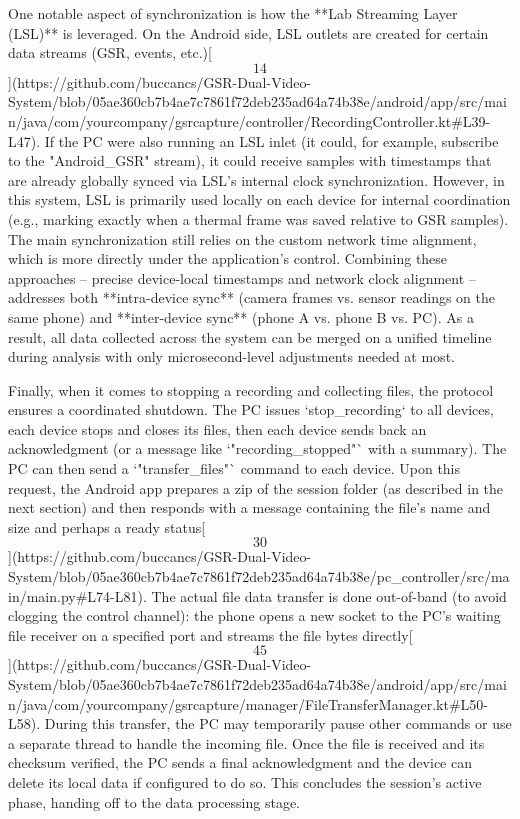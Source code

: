 \documentclass[12pt,a4paper]{article}
\begin{document}
{One notable aspect of synchronization is how the **Lab Streaming Layer
(LSL)** is leveraged. On the Android side, LSL outlets are created for
certain data streams (GSR, events,
etc.)[\[14\]](https://github.com/buccancs/GSR-Dual-Video-System/blob/05ae360cb7b4ae7c7861f72deb235ad64a74b38e/android/app/src/main/java/com/yourcompany/gsrcapture/controller/RecordingController.kt#L39-L47).
If the PC were also running an LSL inlet (it could, for example,
subscribe to the "Android_GSR" stream), it could receive samples with
timestamps that are already globally synced via LSL's internal clock
synchronization. However, in this system, LSL is primarily used locally
on each device for internal coordination (e.g., marking exactly when a
thermal frame was saved relative to GSR samples). The main
synchronization still relies on the custom network time alignment, which
is more directly under the application's control. Combining these
approaches -- precise device-local timestamps and network clock
alignment -- addresses both **intra-device sync** (camera frames vs.
sensor readings on the same phone) and **inter-device sync** (phone A
vs. phone B vs. PC). As a result, all data collected across the system
can be merged on a unified timeline during analysis with only
microsecond-level adjustments needed at most.

Finally, when it comes to stopping a recording and collecting files, the
protocol ensures a coordinated shutdown. The PC issues `stop_recording`
to all devices, each device stops and closes its files, then each device
sends back an acknowledgment (or a message like `"recording_stopped"`
with a summary). The PC can then send a `"transfer_files"` command to
each device. Upon this request, the Android app prepares a zip of the
session folder (as described in the next section) and then responds with
a message containing the file's name and size and perhaps a ready
status[\[30\]](https://github.com/buccancs/GSR-Dual-Video-System/blob/05ae360cb7b4ae7c7861f72deb235ad64a74b38e/pc_controller/src/main/main.py#L74-L81).
The actual file data transfer is done out-of-band (to avoid clogging the
control channel): the phone opens a new socket to the PC's waiting file
receiver on a specified port and streams the file bytes
directly[\[45\]](https://github.com/buccancs/GSR-Dual-Video-System/blob/05ae360cb7b4ae7c7861f72deb235ad64a74b38e/android/app/src/main/java/com/yourcompany/gsrcapture/manager/FileTransferManager.kt#L50-L58).
During this transfer, the PC may temporarily pause other commands or use
a separate thread to handle the incoming file. Once the file is received
and its checksum verified, the PC sends a final acknowledgment and the
device can delete its local data if configured to do so. This concludes
the session's active phase, handing off to the data processing stage.

}
\end{document}
